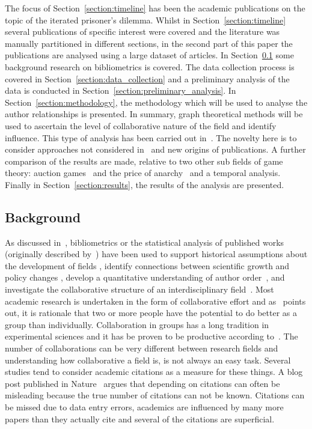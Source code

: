 \documentclass{article}
\theoremstyle{definition}
\begin{document}
The focus of Section~\ref{section:timeline} has been the academic publications on
the topic of the iterated prisoner's dilemma. Whilst in Section~\ref{section:timeline}
several publications of specific interest were covered and the literature was manually
partitioned in different sections, in the second part of this paper the publications
are analysed using a large dataset of articles. In Section~\ref{section:background}
some background
research on bibliometrics is covered. The data collection process is covered in
Section~\ref{section:data_collection} and a preliminary analysis of the data is
conducted in Section~\ref{section:preliminary_analysis}. In Section~\ref{section:methodology},
the methodology which will be used to analyse the author relationships is presented.
In summary, graph theoretical methods will be used to ascertain the level of
collaborative nature of the field and identify influence.
This type of analysis has been carried out in~\cite{Liu2015}. The novelty here
is to consider approaches not considered in~\cite{Liu2015} and new origins of
publications. A further comparison of the results are made, relative to
two other sub fields of game theory: auction games~\cite{menezes2005} and
the price of anarchy~\cite{roughgarden2005} and a temporal analysis.
Finally in Section~\ref{section:results}, the results of the analysis are presented.

\subsection{Background}\label{section:background}

As discussed in~\cite{youngblood2018}, bibliometrics or the statistical analysis
of published works (originally described by~\cite{pritchard1969}) 
have been used to support historical assumptions about the development of fields
\cite{raina1998}, identify connections between scientific growth and policy changes 
\cite{das2016}, develop a quantitative understanding of author order~\cite{sekara2018},
and investigate the collaborative structure of an interdisciplinary field~\cite{Liu2015}.
Most academic research is undertaken in the form of collaborative effort and as~\cite{Kyvik2017}
points out, it is rationale that two or more people have the potential to do better
as a group than individually. Collaboration in groups has a long tradition in experimental 
sciences and it has be proven to be productive according to~\cite{Etzkowitz1992}.
The number of collaborations can be very different between research fields and
understanding how collaborative a field is, is not always an easy task.
Several studies tend to consider academic citations as a measure for these things.
A blog post published in Nature~\cite{nature_blog} argues that depending on citations
can often be misleading because the true number of citations can not be
known. Citations can be missed due to data entry errors, academics are influenced
by many more papers than they actually cite and several of the citations are
superficial.
\end{document}
